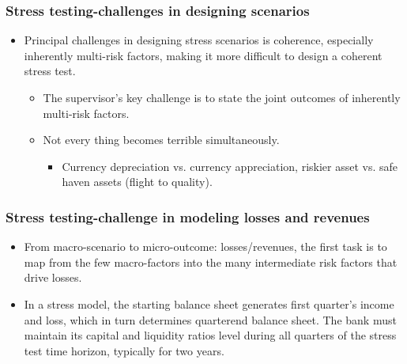 \subsubsection{Stress testing-challenges in designing scenarios}
\begin{itemize}
\item Principal challenges in designing stress scenarios is coherence, especially inherently multi-risk factors, making it more difficult to design a coherent stress test.
    \begin{itemize}
    \item The supervisor's key challenge is to state the joint outcomes of inherently multi-risk factors.
    \item Not every thing becomes terrible simultaneously.
        \begin{itemize}
        \item Currency depreciation vs. currency appreciation, riskier asset vs. safe haven assets (flight to quality).
        \end{itemize}
        
    \end{itemize}
\end{itemize}



\subsubsection{Stress testing-challenge in modeling losses and revenues}
\begin{itemize}
\item From macro-scenario to micro-outcome: losses/revenues, the first task is to map from the few macro-factors into the many intermediate risk factors that drive losses.
\item In a stress model, the starting balance sheet generates first quarter's income and loss, which in turn determines quarterend balance sheet. The bank must maintain its capital and liquidity ratios level during all quarters of the stress test time horizon, typically for two years.
\end{itemize}



